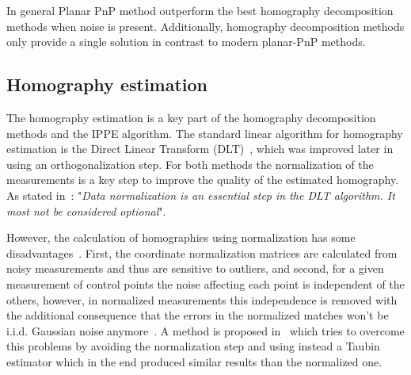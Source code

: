 \documentclass[letterpaper, 10 pt, conference]{ieeeconf}  %
\begin{document}
	
	
	In general Planar PnP method outperform the best homography decomposition methods when noise is present. Additionally, homography decomposition methods only provide a single solution in contrast to modern planar-PnP methods.
	
	\subsection{Homography estimation}
	The homography estimation is a key part of the homography decomposition methods and the IPPE algorithm. The standard linear algorithm for homography estimation is the Direct Linear Transform (DLT)~\cite{RichardHartley2003}, which was improved later in~\cite{Harker2005} using an orthogonalization step. For both methods the normalization of the measurements is a key step to improve the quality of the estimated homography. As stated in~\cite{RichardHartley2003}: "\textit{Data normalization is an essential step in the DLT algorithm. It most not be considered optional}".
	
	However, the calculation of homographies using normalization has some disadvantages~\cite{Rangarajan2009}. First, the coordinate normalization matrices are calculated from noisy measurements and thus are sensitive to outliers, and second, for a given measurement of control points the noise affecting each point is independent of the others, however, in normalized measurements this independence is removed with the additional consequence that the errors in the normalized matches won't be i.i.d. Gaussian noise anymore~\cite{Chen2009}. A method is proposed in~\cite{Rangarajan2009} which tries to overcome this problems by avoiding the normalization step and using instead a Taubin estimator which in the end produced similar results than the normalized one.
	
\end{document}

